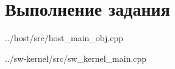 \section{Выполнение задания}

\begin{lstinputlisting}[
	label={},
	caption={код хост-подсистемы},
	]{../host/src/host_main_obj.cpp}
\end{lstinputlisting}

\begin{lstinputlisting}[
	label={},
	caption={код обработчика программного ядра},
	]{../sw-kernel/src/sw_kernel_main.cpp}
\end{lstinputlisting}